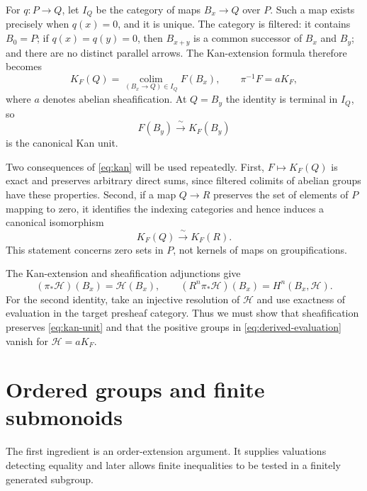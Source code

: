 \documentclass[11pt]{article}
\theoremstyle{definition}
\theoremstyle{remark}
\newcommand{\colim}{\operatorname*{colim}}
\begin{document}
For $q:P\to Q$, let $I_Q$ be the category of maps $B_x\to Q$ over $P$. Such a map exists precisely when $q(x)=0$, and it is unique. The category is filtered: it contains $B_0=P$; if $q(x)=q(y)=0$, then $B_{x+y}$ is a common successor of $B_x$ and $B_y$; and there are no distinct parallel arrows. The Kan-extension formula therefore becomes
\begin{equation}\label{eq:kan}
 K_F(Q)=\colim_{(B_x\to Q)\in I_Q}F(B_x),\qquad
 \pi^{-1}F=aK_F,
\end{equation}
where $a$ denotes abelian sheafification. At $Q=B_y$ the identity is terminal in $I_Q$, so
\begin{equation}\label{eq:kan-unit}
 F(B_y)\xrightarrow{\ \sim\ }K_F(B_y)
\end{equation}
is the canonical Kan unit.

Two consequences of \eqref{eq:kan} will be used repeatedly. First, $F\mapsto K_F(Q)$ is exact and preserves arbitrary direct sums, since filtered colimits of abelian groups have these properties. Second, if a map $Q\to R$ preserves the set of elements of $P$ mapping to zero, it identifies the indexing categories and hence induces a canonical isomorphism
\begin{equation}\label{eq:zero-kernel}
 K_F(Q)\xrightarrow{\ \sim\ }K_F(R).
\end{equation}
This statement concerns zero sets in $P$, not kernels of maps on groupifications.

The Kan-extension and sheafification adjunctions give
\begin{equation}\label{eq:derived-evaluation}
 (\pi_*\mathcal H)(B_x)=\mathcal H(B_x),\qquad
 (R^n\pi_*\mathcal H)(B_x)=H^n(B_x,\mathcal H).
\end{equation}
For the second identity, take an injective resolution of $\mathcal H$ and use exactness of evaluation in the target presheaf category. Thus we must show that sheafification preserves \eqref{eq:kan-unit} and that the positive groups in \eqref{eq:derived-evaluation} vanish for $\mathcal H=aK_F$.

\section{Ordered groups and finite submonoids}

The first ingredient is an order-extension argument. It supplies valuations detecting equality and later allows finite inequalities to be tested in a finitely generated subgroup.
\end{document}

